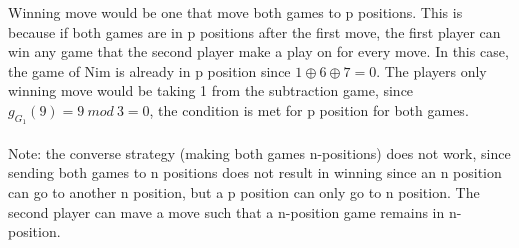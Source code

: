 \documentclass[addpoints,answers]{exam}
\begin{document}
\begin{questions}
\begin{solutionorbox}[\stretch{1}]
							Winning move would be one that move both games to p positions.
							This is because if both games are in p positions after the first
							move, the first player can win any game that the second player
							make a play on for every move. In this case, the game of Nim is
							already in p position since $1 \oplus 6 \oplus 7 = 0$. The players
							only winning move would be taking 1 from the subtraction game,
							since $g_{G_1}(9)=9\ mod\ 3=0$, the condition is met for p
							position for both games. \\\\
							Note: the converse strategy (making both games n-positions) does not work,
							since sending both games to n positions does not result in winning
							since an n position can go to another n position, but a p position
							can only go to n position. The second player can mave a move such
							that a n-position game remains in n-position.
            \end{solutionorbox}
            \newpage
 
\end{questions}
\end{document}
